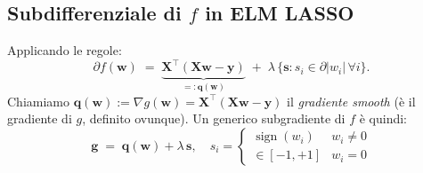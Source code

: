 \documentclass[11pt,a4paper]{article}
\newcommand{\bw}{\mathbf{w}}
\newcommand{\bg}{\mathbf{g}}
\newcommand{\by}{\mathbf{y}}
\newcommand{\bX}{\mathbf{X}}
\newcommand{\bs}{\mathbf{s}}
\newcommand{\bq}{\mathbf{q}}
\theoremstyle{definition}
\begin{document}
\subsection{Subdifferenziale di $f$ in ELM LASSO}

Applicando le regole:
\[
\partial f(\bw) \;=\; \underbrace{\bX^\top(\bX\bw-\by)}_{=:\bq(\bw)} \;+\; \lambda\,\{\bs : s_i\in\partial|w_i|\,\forall i\}.
\]
Chiamiamo $\bq(\bw):=\nabla g(\bw) = \bX^\top(\bX\bw-\by)$ il \emph{gradiente smooth} (è il gradiente di $g$, definito ovunque). Un generico subgradiente di $f$ è quindi:
\begin{equation}
\label{eq:f-subgrad}
\boxed{\;\;\bg \;=\; \bq(\bw) + \lambda\,\bs,\quad
s_i = \begin{cases}\operatorname{sign}(w_i) & w_i \neq 0 \\ \in[-1,+1] & w_i = 0\end{cases}\;\;}
\end{equation}
\end{document}
